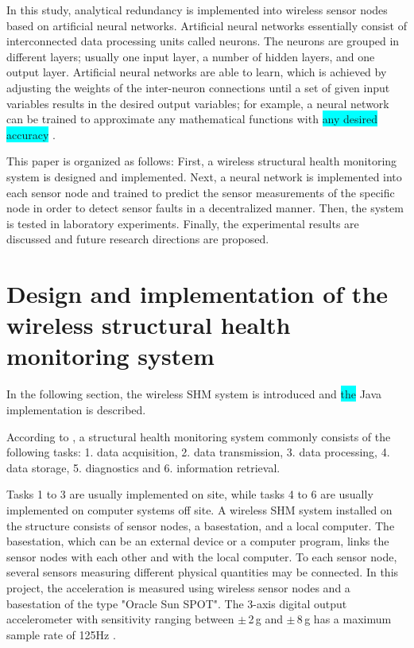 \documentclass[12pt,a4paper]{scrartcl}
\begin{document}
In this study, analytical redundancy is implemented into wireless sensor nodes based on artificial neural networks.
Artificial neural networks essentially consist of interconnected data processing units called neurons. 
The neurons are grouped in different layers; usually one input layer, a number of hidden layers, and one output layer.
Artificial neural networks are able to learn, which is achieved by adjusting the weights of the inter-neuron connections until a set of given input variables results in the desired output variables; for example, a neural network can be trained to approximate any mathematical functions with \colorbox{cyan}{any desired accuracy} \citep{Li2011}.

This paper is organized as follows:
First, a wireless structural health monitoring system is designed and implemented. 
Next, a neural network is implemented into each sensor node and trained to predict the sensor measurements of the specific node in order to detect sensor faults in a decentralized manner. 
Then, the system is tested in laboratory experiments. 
Finally, the experimental results are discussed and future research directions are proposed.


\newpage

\section*{Design and implementation of the wireless structural health monitoring system}
In the following section, the wireless SHM system is introduced and \colorbox{cyan}{the} Java implementation is described.

According to \citet{BisbySHM}, a structural health monitoring system commonly consists of the following tasks:
1. data acquisition,
2. data transmission, 
3. data processing,
4. data storage,
5. diagnostics and 
6. information retrieval.

Tasks 1 to 3 are usually implemented on site, while tasks 4 to 6 are usually implemented on computer systems off site.
A wireless SHM system installed on the structure consists of sensor nodes, a basestation, and a local computer. 
The basestation, which can be an external device or a computer program, links the sensor nodes with each other and with the local computer.
To each sensor node, several sensors measuring different physical quantities may be connected. 
In this project, the acceleration is measured using wireless sensor nodes and a basestation of the type "Oracle Sun SPOT". 
The 3-axis digital output accelerometer with sensitivity ranging between $\pm$\,2\,g and $\pm$\,8\,g has a maximum sample rate of 125Hz \citep{eDemo2010}.
\end{document}
